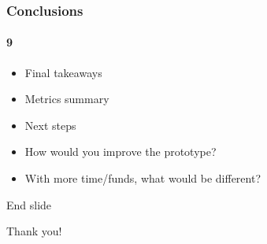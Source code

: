 \documentclass{beamer}
\begin{document}
\begin{frame}
  \frametitle{Conclusions}
  \framesubtitle{9}
  
  \begin{itemize}
    \item Final takeaways
    \item Metrics summary
    \item Next steps
    \item How would you improve the prototype?
    \item With more time/funds, what would be different?
  \end{itemize}
\end{frame}

\begin{frame}
  \centering
  \vspace*{3cm}
  \Huge End slide
  \vspace*{1cm}
  
  Thank you!
  \vspace*{3cm}
\end{frame}
\end{document}
